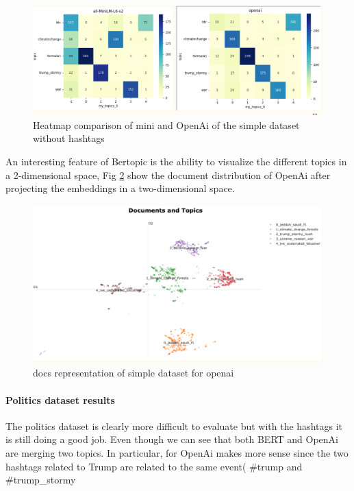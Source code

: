 \begin{figure}[h]
    \centering %
        \includegraphics[width=0.99\linewidth]{Chapter4/figures/topic_heatmap_bertopic.png} 
    \caption{Heatmap comparison of mini and OpenAi of the simple dataset without hashtags}
    \label{figure:supervised heatmap1} %
\end{figure}
An interesting feature of Bertopic is the ability to visualize the different topics in a 2-dimensional space, Fig \ref{fig:openai docs} show the document distribution of OpenAi after projecting the embeddings in a two-dimensional space.
\begin{figure}
    \centering
    \includegraphics[width=1\linewidth]{Chapter4/figures/openai_documents_viz.png}
    \caption{docs representation of simple dataset for openai}
    \label{fig:openai docs}
\end{figure}


\paragraph{Politics dataset results}

The politics dataset is clearly more difficult to evaluate but with the hashtags it is still doing a good job. Even though we can see that both BERT and OpenAi are merging two topics. In particular, for OpenAi makes more sense since the two hashtags related to Trump are related to the same event( \#trump and \#trump\_stormy

